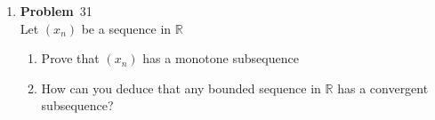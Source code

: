 \documentclass[12pt]{amsart}
\newcommand{\benu}{\begin{enumerate}}
\newcommand{\eenu}{\end{enumerate}}
\theoremstyle{definition}
\newcommand{\mbR}{\mathbb{R}}
\newcommand{\itep}{\item {\bfseries Problem}\ }
\begin{document}
\begin{enumerate}[series=p]
\newpage

\itep 31\\
Let $(x_n)$ be a sequence in $\mbR$
\benu
\item Prove that $(x_n)$ has a monotone subsequence
\item How can you deduce that any bounded sequence in $\mbR$ has a convergent subsequence?
\eenu


\end{enumerate}
\end{document}
